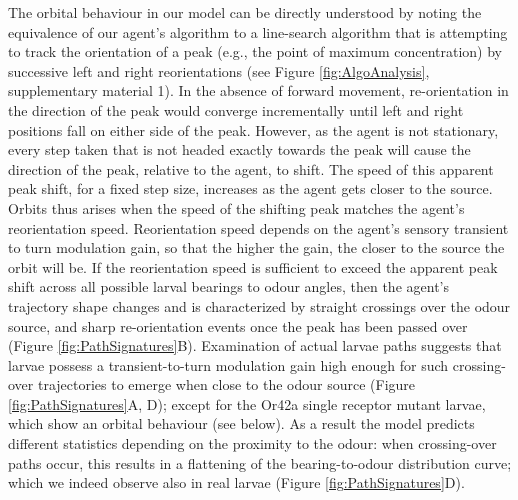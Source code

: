 \documentclass[11pt,a4paper]{article}
\begin{document}
The orbital behaviour in our model can be directly understood by noting the equivalence of our agent's algorithm to a line-search algorithm that is attempting to track the orientation of a peak (e.g., the point of maximum concentration) by successive left and right reorientations (see Figure \ref{fig:AlgoAnalysis}, supplementary material 1). In the absence of forward movement, re-orientation in the direction of the peak would converge incrementally until left and right positions fall on either side of the peak. However, as the agent is not stationary, every step taken that is not headed exactly towards the peak will cause the direction of the peak, relative to the agent, to shift. The speed of this apparent peak shift, for a fixed step size, increases as the agent gets closer to the source. Orbits thus arises when the speed of the shifting peak matches the agent's reorientation speed. Reorientation speed depends on the agent's sensory transient to turn modulation gain, so that the higher the gain, the closer to the source the orbit will be. If the reorientation speed is sufficient to exceed the apparent peak shift across all possible larval bearings to odour angles, then the agent's trajectory shape changes and is characterized by straight crossings over the odour source, and sharp re-orientation events once the peak has been passed over (Figure \ref{fig:PathSignatures}B). Examination of actual larvae paths suggests that larvae possess a transient-to-turn modulation gain high enough for such crossing-over trajectories to emerge when close to the odour source (Figure \ref{fig:PathSignatures}A, D); except for the Or42a single receptor mutant larvae, which show an orbital behaviour (see below). As a result the model predicts different statistics depending on the proximity to the odour: when crossing-over paths occur, this results in a flattening of the bearing-to-odour distribution curve; which we indeed observe also in real larvae (Figure \ref{fig:PathSignatures}D).
\end{document}

